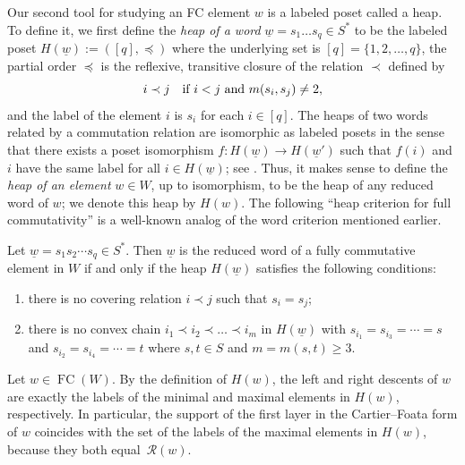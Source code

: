 \documentclass[ALCO,Unicode,published]{cedram}
\newcommand{\calr}{\mathcal{R}}
\newcommand{\ul}{\underline}
\newcommand{\ra}{\rightarrow}
\DeclareMathOperator{\fc}{\mathrm{FC}}
\begin{document}
Our second tool for studying an FC element $w$ is a labeled poset called a {heap}. To define it, we
first define the \emph{heap of a word} $\underline w=s_1\dots s_q\in S^*$ to be the labeled poset
$H(\underline w):=([q], \preceq)$ where the underlying set is $[q]=\{1,2,\dots,q\}$, the partial
order $\preceq$ is the reflexive, transitive closure of the relation $\prec$ defined by \[ i\prec j
\text{\quad if $i< j$ and $m(s_i,s_j)\neq 2$}, \] and the label of the element $i$ is $s_i$ for each
$i\in [q]$.  The heaps of two words related by a commutation relation are isomorphic as labeled
posets in the sense that there exists a poset isomorphism $f:H({\ul w})\ra H({\ul w'})$ such that
$f(i)$ and $i$ have the same label for all $i\in H({\ul w})$; see \cite[\S 2.2]{FC}.  Thus, it makes
sense to define the \emph{heap of an element} $w\in W$, up to isomorphism, to be the heap of any
reduced word of $w$; we denote this heap by $H(w)$. The following ``heap criterion for full
commutativity'' is a well-known analog of the word criterion mentioned earlier. 

\begin{prop}[{\cite[Proposition 3.3]{FC}}]
    \label{prop:FCCriterion}
    Let  $\underline w= s_1s_2\cdots s_q\in S^*$. Then $\underline w$ is the reduced word of a fully commutative
    element in $W$ if and only if the heap $H(\underline w)$ satisfies the following conditions: 
    \begin{enumerate}
        \item there is no covering relation $i\prec j$ such that $s_i=s_j$;
        \item there is no convex chain $i_1\prec i_2\prec \ldots \prec i_m$ in $H(\underline w)$ with
             $s_{i_1}=s_{i_3}=\cdots = s$ and $s_{i_2}=s_{i_4}=\cdots=t$ where $s,t\in S$ and $m = m(s,t)\ge 3$.
    \end{enumerate} 
\end{prop}

\begin{remark}
    Let $w\in \fc(W)$.  By the  definition of $H(w)$, the left and right descents of $w$ are exactly
    the labels of the minimal and maximal elements in $H(w)$, respectively. In particular, the
    support of the first layer in the Cartier--Foata form of $w$ coincides with the set of the
    labels of the maximal elements in $H(w)$, because they both equal~$\calr(w)$.
    \label{rmk:heapsAndWords}
\end{remark}
\end{document}
